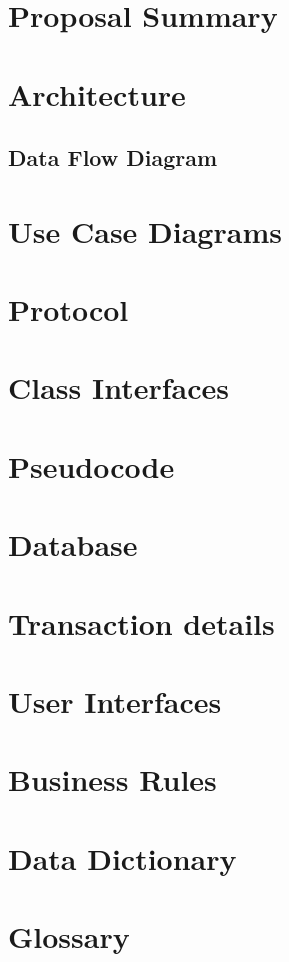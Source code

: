 \chapter{Proposal Summary}


\chapter{Architecture}


\section{Data Flow Diagram}


\chapter{Use Case Diagrams}


\chapter{Protocol}


\chapter{Class Interfaces}


\chapter{Pseudocode}


\chapter{Database}


\chapter{Transaction details}


\chapter{User Interfaces}


\chapter{Business Rules}


%

\chapter{Data Dictionary}


\chapter{Glossary}

